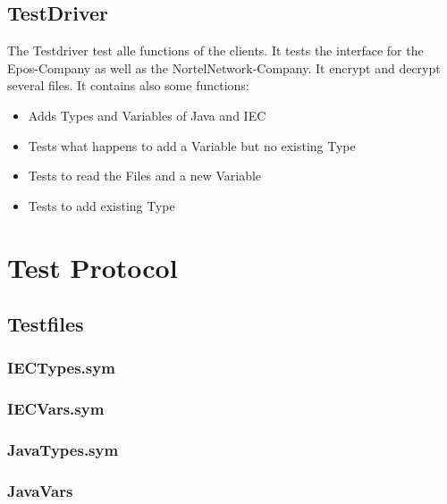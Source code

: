 \subsection{TestDriver}
The Testdriver test alle functions of the clients. It tests the interface for the Epos-Company as well as the NortelNetwork-Company. It encrypt and decrypt several files. It contains also some functions:
\begin{itemize}
	\item Adds Types and Variables of Java and IEC
	\item Tests what happens to add a Variable but no existing Type
	\item Tests to read the Files and a new Variable
	\item Tests to add existing Type 
\end{itemize}

\newpage
\section{Test Protocol}

\subsection{Testfiles}
\subsubsection{IECTypes.sym}
\subsubsection{IECVars.sym}

\subsubsection{JavaTypes.sym}
\subsubsection{JavaVars}


